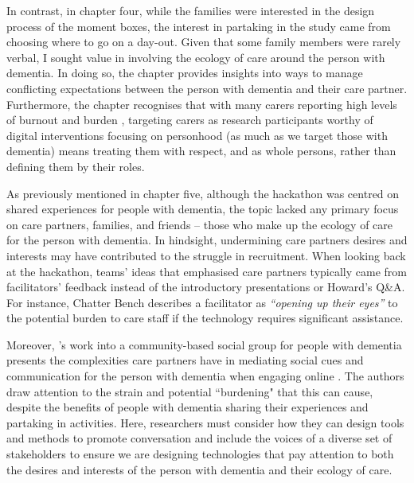 In contrast, in chapter four, while the families were interested in the design process of the moment boxes, the interest in partaking in the study came from choosing where to go on a day-out. Given that some family members were rarely verbal, I sought value in involving the ecology of care around the person with dementia. In doing so, the chapter provides insights into ways to manage conflicting expectations between the person with dementia and their care partner. Furthermore, the chapter recognises that with many carers reporting high levels of burnout and burden \citep{lee_technology-based_2015},  targeting carers as research participants worthy of digital interventions focusing on personhood (as much as we target those with dementia) means treating them with respect, and as whole persons, rather than defining them by their roles. 

As previously mentioned in chapter five, although the hackathon was centred on shared experiences for people with dementia, the topic lacked any primary focus on care partners, families, and friends – those who make up the ecology of care for the person with dementia. In hindsight, undermining care partners desires and interests may have contributed to the struggle in recruitment. When looking back at the hackathon, teams' ideas that emphasised care partners typically came from facilitators' feedback instead of the introductory presentations or Howard's Q\&A. For instance, Chatter Bench describes a facilitator as \textit{``opening up their eyes''} to the potential burden to care staff if the technology requires significant assistance. 

Moreover, \citeauthor{dai2020making}'s work into a community-based social group for people with dementia presents the complexities care partners have in mediating social cues and communication for the person with dementia when engaging online \citep{dai2020making}. The authors draw attention to the strain and potential ``burdening" that this can cause, despite the benefits of people with dementia sharing their experiences and partaking in activities. Here, researchers must consider how they can design tools and methods to promote conversation and include the voices of a diverse set of stakeholders to ensure we are designing technologies that pay attention to both the desires and interests of the person with dementia and their ecology of care.


